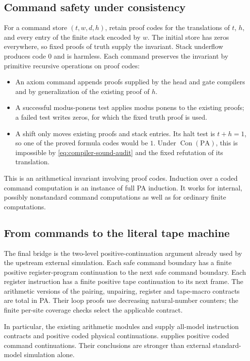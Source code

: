\subsection{Command safety under consistency}

For a command store $(t,w,d,h)$, retain proof codes for the translations of
$t$, $h$, and every entry of the finite stack encoded by $w$. The initial
store has zeros everywhere, so fixed proofs of truth supply the invariant.
Stack underflow produces code $0$ and is harmless. Each command preserves
the invariant by primitive recursive operations on proof codes:
\begin{itemize}
\item An axiom command appends proofs supplied by the head and gate
  compilers and by generalization of the existing proof of $h$.
\item A successful modus-ponens test applies modus ponens to the existing
  proofs; a failed test writes zeros, for which the fixed truth proof is
  used.
\item A shift only moves existing proofs and stack entries. Its halt test
  is $t+h=1$, so one of the proved formula codes would be $1$. Under
  $\operatorname{Con}(\mathrm{PA})$, this is impossible by
  \eqref{eq:compiler-sound-audit} and the fixed refutation of its translation.
\end{itemize}
This is an arithmetical invariant involving proof codes. Induction over a
coded command computation is an instance of full PA induction. It works
for internal, possibly nonstandard command computations as well as for
ordinary finite computations.

\subsection{From commands to the literal tape machine}

The final bridge is the two-level positive-continuation argument already
used by the upstream external simulation. Each safe command boundary has
a finite positive register-program continuation to the next safe command
boundary. Each register instruction has a finite positive tape continuation
to its next frame. The arithmetic versions of the pairing, unpairing,
register and tape-macro contracts are total in PA. Their loop proofs use
decreasing natural-number counters; the finite per-site coverage checks
select the applicable contract.

In particular, the existing arithmetic modules
 and
 supply all-model
instruction contracts and positive coded physical continuations.
 supplies positive coded command
continuations. Their conclusions are stronger than external standard-model
simulation alone.

